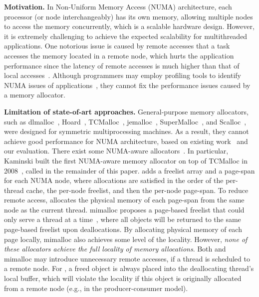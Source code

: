 \textbf{Motivation.} In Non-Uniform Memory Access (NUMA) architecture, each processor (or node interchangeably) has its own memory, allowing multiple nodes to access the memory concurrently, which is a scalable hardware design. 
However, it is extremely challenging to achieve the expected scalability for multithreaded applications. One notorious issue is caused by remote accesses that a task accesses the memory located in a remote node, which hurts the application performance since the latency of remote accesses is much higher than that of local accesses~\cite{Blagodurov:2011:CNC:2002181.2002182}. 
Although programmers may employ profiling tools to identify NUMA issues of applications~\cite{Intel:VTune, Memphis, Lachaize:2012:MMP:2342821.2342826, XuNuma, NumaMMA, 7847070, NumaPerf}, they cannot fix the performance issues caused by a memory allocator.


\textbf{Limitation of state-of-art approaches.} General-purpose memory allocators, such as dlmalloc~\cite{dlmalloc},  Hoard~\cite{Hoard}, TCMalloc~\cite{tcmalloc}, jemalloc~\cite{jemalloc}, SuperMalloc~\cite{supermalloc}, and  Scalloc~\cite{Scalloc},  were designed for symmetric multiprocessing machines. As a result, they cannot achieve good performance for NUMA architecture, based on existing work~\cite{tcmallocnew, yang2019jarena} and our evaluation. There exist some NUMA-aware allocators~\cite{ tcmallocnew, tcmalloc2, kim2013node, yang2019jarena, mimalloc}. In particular, Kaminski built the first NUMA-aware memory allocator on top of TCMalloc in 2008~\cite{tcmallocnew}, called \TN{} in the remainder of this paper. \TN{} adds a freelist array and a page-span for each NUMA node, where allocations are satisfied in the order of the per-thread cache, the per-node freelist, and then the per-node page-span. To reduce remote access, \TN{} allocates the physical memory of each page-span from the same node as the current thread. mimalloc proposes a page-based freelist that could only serve a thread at a time~\cite{mimalloc}, where all objects will be returned to the same page-based freelist upon deallocations. By allocating physical memory of each page locally, mimalloc also achieves some level of the locality. However, \textit{none of these allocators achieve the full locality of memory allocations}. Both \TN{} and mimalloc may introduce unnecessary remote accesses, if a thread is scheduled to a remote node. For \TN{}, a freed object is always placed into the deallocating thread's local buffer, which will violate the locality if this object is originally allocated from a remote node  (e.g., in the producer-consumer model). 

